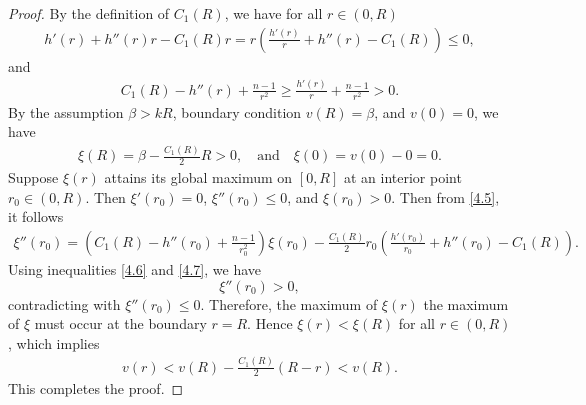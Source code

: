 \documentclass[11pt,leqno]{amsart}
\numberwithin{equation}{section}
\begin{document}
\begin{proof}
By the definition of $C_1(R)$, we have for all $r\in (0, R)$
\begin{align}\label{4.6}
h'(r)+h''(r)r-C_1(R)r = r\left(\frac{h'(r)}{r}+h''(r)-C_1(R)\right) \leq 0,
\end{align}
and 
\begin{align}\label{4.7}
 C_1(R) - h''(r) + \frac{n-1}{r^2} \ge \frac{h'(r)}{r} + \frac{n-1}{r^2} > 0.
\end{align}
By the assumption $\beta > kR$,  boundary condition $v(R)=\beta$, and $v(0)=0$, we have
\begin{align*}
   \xi(R) = \beta - \frac {C_1(R)}2R > 0, \quad \text{and}\quad \xi(0) = v(0) - 0 = 0. 
\end{align*}
Suppose $\xi(r)$ attains its global maximum on $[0,R]$ at an interior point $r_{0}\in(0,R)$. Then $\xi'(r_{0})=0$, $\xi''(r_{0})\leq 0$, and $\xi(r_0) > 0$. Then from \eqref{4.5}, it follows 
\begin{align*}
\xi''(r_{0}) = \left(C_{1}(R)-h''(r_0)+\frac{n-1}{r_0^{2}}\right)\xi(r_0) - \frac{C_{1}(R)}{2}r_0\left(\frac{h'(r_0)}{r_0}+h''(r_0)-C_{1}(R)\right).
\end{align*}
Using inequalities \eqref{4.6} and \eqref{4.7}, we have
$$
\xi''(r_0)>0,
$$
contradicting with $\xi''(r_0)\le 0$. Therefore, the maximum of $\xi(r)$
 the maximum of $\xi$ must occur at the boundary $r=R$. Hence $\xi(r) < \xi(R)$ for all $r\in(0,R)$, which implies
\begin{align*}
v(r) < v(R) - \frac{C_{1}(R)}{2}(R-r) < v(R).
\end{align*}
This completes the proof.
\end{proof}
\end{document}
